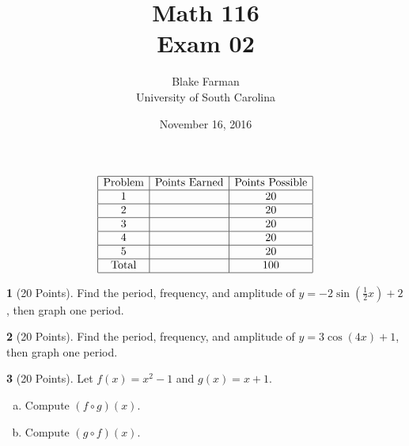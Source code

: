 \documentclass[12pt]{amsart}
\author{Blake Farman\\University of South Carolina}
\title{Math 116\\Exam 02}
\date{November 16, 2016}
\begin{document}
\maketitle

\begin{center}
\end{center}

\vspace{0.2in}
\vspace{0.2in}

$$
\begin{array}{|c|c|c|}
  \hline
  \text{Problem} & \text{Points Earned} & \text{Points Possible}\\
  \hline
  1 & & 20\\
  \hline
  2 & & 20\\
  \hline
  3 & & 20\\
  \hline
  4 & & 20\\
  \hline
  5 & & 20 \\
  \hline
  \text{Total} & & 100\\
  \hline
\end{array}
$$
\newpage

\theoremstyle{definition}
\newtheorem{thm}{}
\newtheorem{lem}{Lemma}
\theoremstyle{definition}
\newtheorem{defn}{Definition}

\begin{thm}[20 Points]\label{ex1}
  Find the period, frequency, and amplitude of $y = -2\sin\left(\frac{1}{2}x\right) + 2$, then graph one period.
\end{thm}

\newpage

\begin{thm}[20 Points]\label{ex2}
  Find the period, frequency, and amplitude of $y = 3\cos(4x) + 1$, then graph one period.
\end{thm}

\newpage
\begin{thm}[20 Points]\label{ex3}
  Let $f(x) = x^2 - 1$ and $g(x) = x + 1$.
  \begin{enumerate}[(a)]
  \item
    Compute $(f \circ g)(x)$.
    \vspace{2in}
  \item
    Compute $(g \circ f)(x)$.
    \vspace{2in}
  \end{enumerate}
\end{thm}
\end{document}
